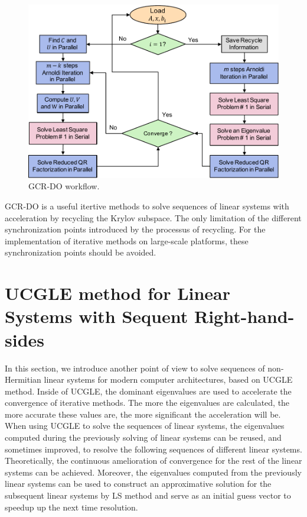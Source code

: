 \begin{figure}[htbp]
	\centering
	\includegraphics[width=0.9\linewidth]{fig/gcrdo.pdf}
	\caption{GCR-DO workflow.}
	\label{fig:gcrdo}
\end{figure}

GCR-DO is a useful itertive methods to solve sequences of linear systems with acceleration by recycling the Krylov subspace. The only limitation of the different synchronization points introduced by the processus of recycling. For the implementation of iterative methods on large-scale platforms, these synchronization points should be avoided.


\section{UCGLE method for Linear Systems with Sequent Right-hand-sides}

In this section, we introduce another point of view to solve sequences of non-Hermitian linear systems for modern computer architectures, based on UCGLE method. Inside of UCGLE, the dominant eigenvalues are used to accelerate the convergence of iterative methods. The more the eigenvalues are calculated, the more accurate these values are, the more significant the acceleration will be. When using UCGLE to solve the sequences of linear systems, the eigenvalues computed during the previously solving of linear systems can be reused, and sometimes improved, to resolve the following sequences of different linear systems. Theoretically, the continuous amelioration of convergence for the rest of the linear systems can be achieved. Moreover, the eigenvalues computed from the previously linear systems can be used to construct an approximative solution for the subsequent linear systems by LS method and serve as an initial guess vector to speedup up the next time resolution.

